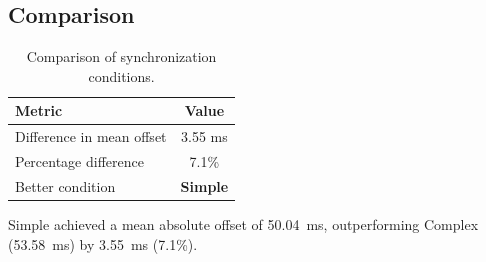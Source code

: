 \subsection*{Comparison}

\begin{table}[h!]
\centering
\begin{tabular}{|l|c|}
\hline
Metric & Value \\
\hline
Difference in mean offset & 3.55 ms \\
Percentage difference & 7.1\% \\
Better condition & \textbf{Simple} \\
\hline
\end{tabular}
\caption{Comparison of synchronization conditions.}
\label{tab:sync_comparison}
\end{table}

Simple achieved a mean absolute offset of 50.04~ms, outperforming Complex (53.58~ms) by 3.55~ms (7.1\%).
